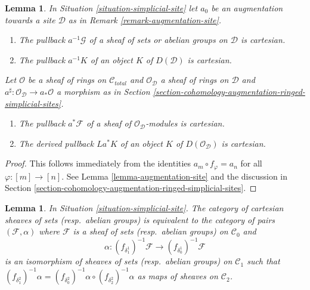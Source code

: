 \documentclass{stacks-project}
\theoremstyle{plain}
\newtheorem{lemma}[subsection]{Lemma}
\theoremstyle{definition}
\theoremstyle{remark}
\numberwithin{equation}{subsection}
\begin{document}
\begin{lemma}
\label{lemma-augmentation-cartesian-module}
In Situation \ref{situation-simplicial-site} let
$a_0$ be an augmentation towards a site $\mathcal{D}$ as in
Remark \ref{remark-augmentation-site}.
\begin{enumerate}
\item The pullback $a^{-1}\mathcal{G}$ of a sheaf of sets or abelian groups
on $\mathcal{D}$ is cartesian.
\item The pullback $a^{-1}K$ of an object $K$ of $D(\mathcal{D})$
is cartesian.
\end{enumerate}
Let $\mathcal{O}$ be a sheaf of rings on $\mathcal{C}_{total}$ and
$\mathcal{O}_\mathcal{D}$ a sheaf of rings on $\mathcal{D}$
and $a^\sharp : \mathcal{O}_\mathcal{D} \to a_*\mathcal{O}$ a
morphism as in
Section \ref{section-cohomology-augmentation-ringed-simplicial-sites}.
\begin{enumerate}
\item[(3)] The pullback $a^*\mathcal{F}$ of a sheaf of
$\mathcal{O}_\mathcal{D}$-modules is cartesian.
\item[(4)] The derived pullback $La^*K$ of an object
$K$ of $D(\mathcal{O}_\mathcal{D})$ is cartesian.
\end{enumerate}
\end{lemma}

\begin{proof}
This follows immediately from the identities
$a_m \circ f_\varphi = a_n$ for all $\varphi : [m] \to [n]$.
See Lemma \ref{lemma-augmentation-site} and the discussion in
Section \ref{section-cohomology-augmentation-ringed-simplicial-sites}.
\end{proof}

\begin{lemma}
\label{lemma-characterize-cartesian}
In Situation \ref{situation-simplicial-site}.
The category of cartesian sheaves of sets (resp.\ abelian groups)
is equivalent to the category of pairs $(\mathcal{F}, \alpha)$
where $\mathcal{F}$ is a sheaf of sets (resp.\ abelian groups)
on $\mathcal{C}_0$ and
$$
\alpha :
(f_{\delta_1^1})^{-1}\mathcal{F}
\longrightarrow (f_{\delta_0^1})^{-1}\mathcal{F}
$$
is an isomorphism of sheaves of sets (resp.\ abelian groups)
on $\mathcal{C}_1$ such that
$(f_{\delta^2_1})^{-1}\alpha =
(f_{\delta^2_0})^{-1}\alpha \circ (f_{\delta^2_2})^{-1}\alpha$
as maps of sheaves on $\mathcal{C}_2$.
\end{lemma}
\end{document}
